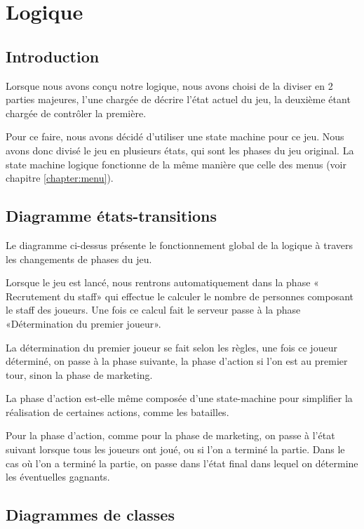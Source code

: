 \chapter{Logique} \label{chapter:logique}
\section{Introduction}
Lorsque nous avons conçu notre logique, nous avons choisi de la diviser en 2
parties majeures, l'une chargée de décrire l'état actuel du jeu, la deuxième
étant chargée de contrôler la première.

Pour ce faire, nous avons décidé d'utiliser une state machine pour ce jeu.
Nous avons donc divisé le jeu en plusieurs états, qui sont les phases du jeu original.
La state machine logique fonctionne de la même manière que celle des menus (voir chapitre \ref{chapter:menu}).

\section{Diagramme états-transitions}


Le diagramme ci-dessus présente le fonctionnement global de la logique à travers
les changements de phases du jeu.

Lorsque le jeu est lancé, nous rentrons automatiquement dans la phase «
Recrutement du staff» qui effectue le calculer le nombre de
personnes composant le staff des joueurs.
Une fois ce calcul fait le serveur passe à la phase «Détermination du premier joueur».

La détermination du premier joueur se fait selon les règles, une fois ce joueur
déterminé, on passe à la phase suivante, la phase d'action si l'on est au premier
tour, sinon la phase de marketing.

La phase d'action est-elle même composée d'une state-machine pour simplifier la
réalisation de certaines actions, comme les batailles.

Pour la phase d'action, comme pour la phase de marketing, on passe à l'état
suivant lorsque tous les joueurs ont joué, ou si l'on a terminé la partie.
Dans le cas où l'on a terminé la partie, on passe dans l'état final dans lequel
on détermine les éventuelles gagnants.

\section{Diagrammes de classes}
